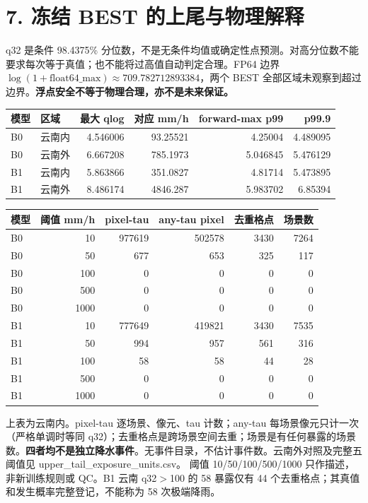 \documentclass[UTF8,a4paper,10pt,fontset=windows]{ctexart}
\begin{document}
\section*{7. 冻结 BEST 的上尾与物理解释}
q32 是条件 98.4375\% 分位数，不是无条件均值或确定性点预测。对高分位数不能要求每次等于真值；也不能将过高值自动判定合理。FP64 边界 $\log(1+\mathrm{float64\_max})\approx709.782712893384$，两个 BEST 全部区域未观察到超过边界。\textbf{浮点安全不等于物理合理，亦不是未来保证。}
\begin{center}\small\begin{tabular}{llrrrr}\toprule
模型 & 区域 & 最大 qlog & 对应 mm/h & forward-max p99 & p99.9\\\midrule
B0 & 云南内 & 4.546006 & 93.25521 & 4.25004 & 4.489095\\
B0 & 云南外 & 6.667208 & 785.1973 & 5.046845 & 5.476129\\
B1 & 云南内 & 5.863866 & 351.0827 & 4.81714 & 5.473895\\
B1 & 云南外 & 8.486174 & 4846.287 & 5.983702 & 6.85394\\
\bottomrule\end{tabular}\end{center}
\begin{center}\small\begin{tabular}{lrrrrr}\toprule
模型 & 阈值 mm/h & pixel-tau & any-tau pixel & 去重格点 & 场景数\\\midrule
B0 & 10 & 977619 & 502578 & 3430 & 7264\\
B0 & 50 & 677 & 653 & 325 & 117\\
B0 & 100 & 0 & 0 & 0 & 0\\
B0 & 500 & 0 & 0 & 0 & 0\\
B0 & 1000 & 0 & 0 & 0 & 0\\
B1 & 10 & 777649 & 419821 & 3430 & 7535\\
B1 & 50 & 994 & 957 & 561 & 316\\
B1 & 100 & 58 & 58 & 44 & 28\\
B1 & 500 & 0 & 0 & 0 & 0\\
B1 & 1000 & 0 & 0 & 0 & 0\\
\bottomrule\end{tabular}\end{center}
上表为云南内。pixel-tau 逐场景、像元、tau 计数；any-tau 每场景像元只计一次（严格单调时等同 q32）；去重格点是跨场景空间去重；场景是有任何暴露的场景数。\textbf{四者均不是独立降水事件}。无事件目录，不估计事件数。云南外对照及完整五阈值见 upper\_tail\_exposure\_units.csv。
阈值 10/50/100/500/1000 只作描述，非新训练规则或 QC。B1 云南 q32$>$100 的 58 暴露仅有 44 个去重格点；其真值和发生概率完整登记，不能称为 58 次极端降雨。
\newpage
\end{document}
